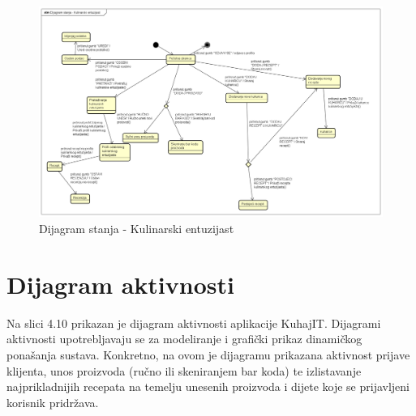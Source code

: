 			\begin{figure}[H]
			\includegraphics[scale=0.2]{dijagrami/UML_dijagram_stanja.png} %
			\centering
			\caption{Dijagram stanja - Kulinarski entuzijast}
			\label{Dijagram stanja - Kulinarski entuzijast}
		\end{figure}
		
		\eject
		
		\section{Dijagram aktivnosti}
		Na slici 4.10 prikazan je dijagram aktivnosti aplikacije KuhajIT. Dijagrami aktivnosti upotrebljavaju se za modeliranje i grafički prikaz dinamičkog ponašanja sustava. Konkretno, na ovom je dijagramu prikazana aktivnost prijave klijenta, unos proizvoda (ručno ili skeniranjem bar koda) te izlistavanje najprikladnijih recepata na temelju unesenih proizvoda i dijete koje se prijavljeni korisnik pridržava.
		
